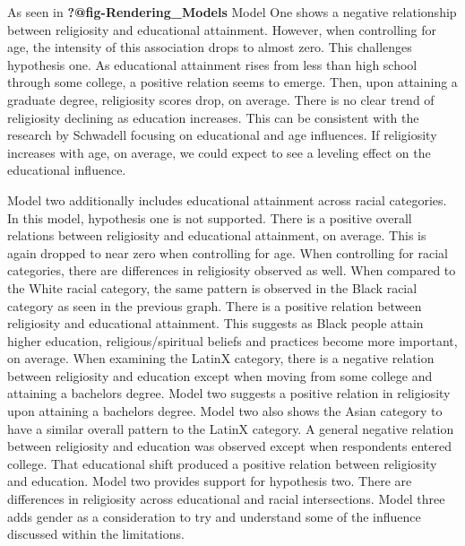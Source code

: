 \documentclass[
  12pt,
  letterpaper,
]{article}
\begin{document}
As seen in \textbf{?@fig-Rendering\_Models} Model One shows a negative
relationship between religiosity and educational attainment. However,
when controlling for age, the intensity of this association drops to
almost zero. This challenges hypothesis one. As educational attainment
rises from less than high school through some college, a positive
relation seems to emerge. Then, upon attaining a graduate degree,
religiosity scores drop, on average. There is no clear trend of
religiosity declining as education increases. This can be consistent
with the research by Schwadell focusing on educational and age
influences. If religiosity increases with age, on average, we could
expect to see a leveling effect on the educational influence.

Model two additionally includes educational attainment across racial
categories. In this model, hypothesis one is not supported. There is a
positive overall relations between religiosity and educational
attainment, on average. This is again dropped to near zero when
controlling for age. When controlling for racial categories, there are
differences in religiosity observed as well. When compared to the White
racial category, the same pattern is observed in the Black racial
category as seen in the previous graph. There is a positive relation
between religiosity and educational attainment. This suggests as Black
people attain higher education, religious/spiritual beliefs and
practices become more important, on average. When examining the LatinX
category, there is a negative relation between religiosity and education
except when moving from some college and attaining a bachelors degree.
Model two suggests a positive relation in religiosity upon attaining a
bachelors degree. Model two also shows the Asian category to have a
similar overall pattern to the LatinX category. A general negative
relation between religiosity and education was observed except when
respondents entered college. That educational shift produced a positive
relation between religiosity and education. Model two provides support
for hypothesis two. There are differences in religiosity across
educational and racial intersections. Model three adds gender as a
consideration to try and understand some of the influence discussed
within the limitations.
\end{document}
